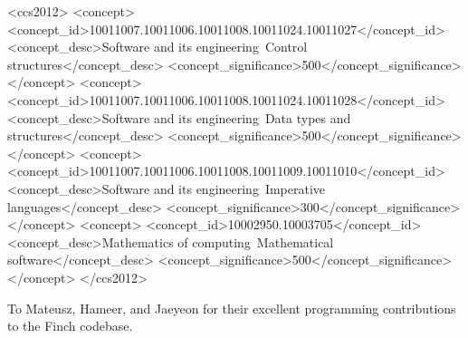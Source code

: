 \documentclass[acmsmall,screen,review,anonymous]{acmart}
\begin{document}
\begin{CCSXML}
  <ccs2012>
  <concept>
  <concept_id>10011007.10011006.10011008.10011024.10011027</concept_id>
  <concept_desc>Software and its engineering~Control structures</concept_desc>
  <concept_significance>500</concept_significance>
  </concept>
  <concept>
  <concept_id>10011007.10011006.10011008.10011024.10011028</concept_id>
  <concept_desc>Software and its engineering~Data types and structures</concept_desc>
  <concept_significance>500</concept_significance>
  </concept>
  <concept>
  <concept_id>10011007.10011006.10011008.10011009.10011010</concept_id>
  <concept_desc>Software and its engineering~Imperative languages</concept_desc>
  <concept_significance>300</concept_significance>
  </concept>
  <concept>
  <concept_id>10002950.10003705</concept_id>
  <concept_desc>Mathematics of computing~Mathematical software</concept_desc>
  <concept_significance>500</concept_significance>
  </concept>
</ccs2012>
\end{CCSXML}
  


\maketitle








\begin{acks}
    To Mateusz, Hameer, and Jaeyeon for their excellent programming contributions to the Finch codebase.
\end{acks}





\appendix


\end{document}
